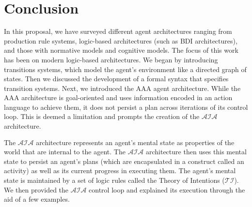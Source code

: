 \chapter{Conclusion}

%
%
%
%

In this proposal, we have surveyed different agent architectures ranging from production rule systems, logic-based architectures (such as BDI architectures), and those with normative models and cognitive models.
The focus of this work has been on modern logic-based architectures.
We began by introducing transitions systems, which model the agent's environment like a directed graph of states.
Then we discussed the development of a formal syntax that specifies transition systems.
Next, we introduced the AAA agent architecture.
While the AAA architecture is goal-oriented and uses information encoded in an action language to achieve them, it does not persist a plan across iterations of its control loop.
This is deemed a limitation and prompts the creation of the $\mathcal{AIA}$ architecture.

The $\mathcal{AIA}$ architecture represents an agent's mental state as properties of the world that are internal to the agent.
The $\mathcal{AIA}$ architecture then uses this mental state to persist an agent's plans (which are encapsulated in a construct called an activity) as well as its current progress in executing them.
The agent's mental state is maintained by a set of logic rules called the Theory of Intentions ($\mathcal{TI}$).
We then provided the $\mathcal{AIA}$ control loop and explained its execution through the aid of a few examples.


